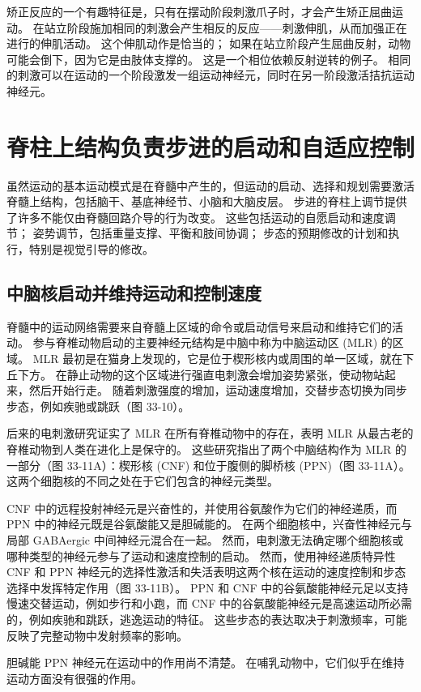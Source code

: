 矫正反应的一个有趣特征是，只有在摆动阶段刺激爪子时，才会产生矫正屈曲运动。 在站立阶段施加相同的刺激会产生相反的反应——刺激伸肌，从而加强正在进行的伸肌活动。 这个伸肌动作是恰当的； 如果在站立阶段产生屈曲反射，动物可能会倒下，因为它是由肢体支撑的。 这是一个相位依赖反射逆转的例子。 相同的刺激可以在运动的一个阶段激发一组运动神经元，同时在另一阶段激活拮抗运动神经元。


\section{脊柱上结构负责步进的启动和自适应控制}
虽然运动的基本运动模式是在脊髓中产生的，但运动的启动、选择和规划需要激活脊髓上结构，包括脑干、基底神经节、小脑和大脑皮层。 步进的脊柱上调节提供了许多不能仅由脊髓回路介导的行为改变。 这些包括运动的自愿启动和速度调节； 姿势调节，包括重量支撑、平衡和肢间协调； 步态的预期修改的计划和执行，特别是视觉引导的修改。

\subsection{中脑核启动并维持运动和控制速度}
脊髓中的运动网络需要来自脊髓上区域的命令或启动信号来启动和维持它们的活动。 参与脊椎动物启动的主要神经元结构是中脑中称为中脑运动区 (MLR) 的区域。 MLR 最初是在猫身上发现的，它是位于楔形核内或周围的单一区域，就在下丘下方。 在静止动物的这个区域进行强直电刺激会增加姿势紧张，使动物站起来，然后开始行走。 随着刺激强度的增加，运动速度增加，交替步态切换为同步步态，例如疾驰或跳跃（图 33-10）。

后来的电刺激研究证实了 MLR 在所有脊椎动物中的存在，表明 MLR 从最古老的脊椎动物到人类在进化上是保守的。 这些研究指出了两个中脑结构作为 MLR 的一部分（图 33-11A）：楔形核 (CNF) 和位于腹侧的脚桥核 (PPN)（图 33-11A）。 这两个细胞核的不同之处在于它们包含的神经元类型。

CNF 中的远程投射神经元是兴奋性的，并使用谷氨酸作为它们的神经递质，而 PPN 中的神经元既是谷氨酸能又是胆碱能的。 在两个细胞核中，兴奋性神经元与局部 GABAergic 中间神经元混合在一起。 然而，电刺激无法确定哪个细胞核或哪种类型的神经元参与了运动和速度控制的启动。 然而，使用神经递质特异性 CNF 和 PPN 神经元的选择性激活和失活表明这两个核在运动的速度控制和步态选择中发挥特定作用（图 33-11B）。 PPN 和 CNF 中的谷氨酸能神经元足以支持慢速交替运动，例如步行和小跑，而 CNF 中的谷氨酸能神经元是高速运动所必需的，例如疾驰和跳跃，逃逸运动的特征。 这些步态的表达取决于刺激频率，可能反映了完整动物中发射频率的影响。

胆碱能 PPN 神经元在运动中的作用尚不清楚。 在哺乳动物中，它们似乎在维持运动方面没有很强的作用。

